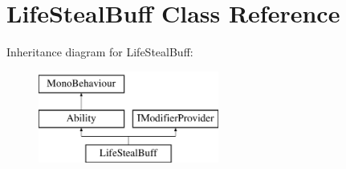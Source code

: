 \hypertarget{class_life_steal_buff}{}\section{Life\+Steal\+Buff Class Reference}
\label{class_life_steal_buff}
Inheritance diagram for Life\+Steal\+Buff\+:\begin{figure}[H]
\begin{center}
\leavevmode
\includegraphics[height=3.000000cm]{class_life_steal_buff}
\end{center}
\end{figure}
